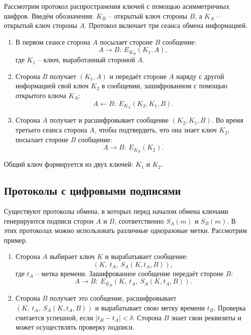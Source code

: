 Рассмотрим протокол распространения ключей с помощью асимметричных шифров. Введём обозначения: $K_B$ -- открытый ключ стороны $B$, а $K_A$ -- открытый ключ стороны $A$. Протокол включает три сеанса обмена информацией.
\begin{enumerate}
    \item В первом сеансе сторона $A$ посылает стороне $B$ сообщение:
            \[ A \rightarrow B: ~ E_{K_B}(K_1, A), \]
        где $K_1$ -- ключ, выработанный стороной $A$.
    \item Сторона $B$ получает $(K_1, A)$ и передаёт стороне $A$ наряду с другой информацией свой ключ $K_2$ в сообщении, зашифрованном с помощью открытого ключа $K_A$:
            \[ A \leftarrow B: ~ E_{K_A}(K_2, K_1, B). \]
    \item Сторона $A$ получает и расшифровывает сообщение $(K_2, K_1, B)$. Во время третьего сеанса сторона $A$, чтобы подтвердить, что она знает ключ $K_2$, посылает стороне $B$ сообщение:
            \[ A \rightarrow B: ~ E_{K_B}(K_2). \]
\end{enumerate}
Общий ключ формируется из двух ключей: $K_1$ и $K_2$.

\subsection{Протоколы с цифровыми подписями}

Существуют протоколы обмена, в которых перед началом обмена ключами генерируются подписи сторон $A$ и $B$, соответственно $S_A(m)$ и $S_B(m)$. В этих протоколах можно использовать различные одноразовые метки. Рассмотрим пример.
\begin{enumerate}
    \item Сторона $A$ выбирает ключ $K$ и вырабатывает сообщение:
            \[ \left( K, ~ t_A, ~ S_A(K, t_A, B) \right), \]
        где $t_A$ -- метка времени. Зашифрованное сообщение передаёт стороне $B$:
        \[ A \rightarrow B: ~ E_{K_B}(K, ~ t_A, ~ S_A(K, t_A, B)). \]
    \item Сторона $B$ получает это сообщение, расшифровывает $\left( K, ~ t_A, ~ S_A(K, t_A, B) \right)$ и вырабатывает свою метку времени $t_B$. Проверка считается успешной, если $|t_B - t_A | < \delta $. Сторона $B$ знает свои реквизиты и может осуществлять проверку подписи.
\end{enumerate}

